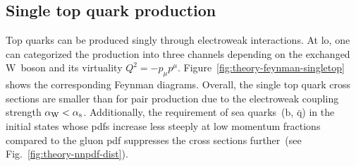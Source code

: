 \subsection{Single top quark production}

Top quarks can be produced singly through electroweak interactions. At \gls{lo}, one can categorized the production into three channels depending on the exchanged $\mathrm{W}$~boson and its virtuality $Q^{2}=-p_{\mu}p^{\mu}$. Figure~\ref{fig:theory-feynman-singletop} shows the corresponding Feynman diagrams. Overall, the single top quark cross sections are smaller than for pair production due to the electroweak coupling strength ${\alpha_\mathrm{W}}<{\alpha_\mathrm{s}}$. Additionally, the requirement of sea quarks~($\mathrm{b}$, $\bar{\mathrm{q}}$) in the initial states whose \glspl{pdf} increase less steeply at low momentum fractions compared to the gluon \gls{pdf} suppresses the cross sections further~(see Fig.~\ref{fig:theory-nnpdf-dist}).

